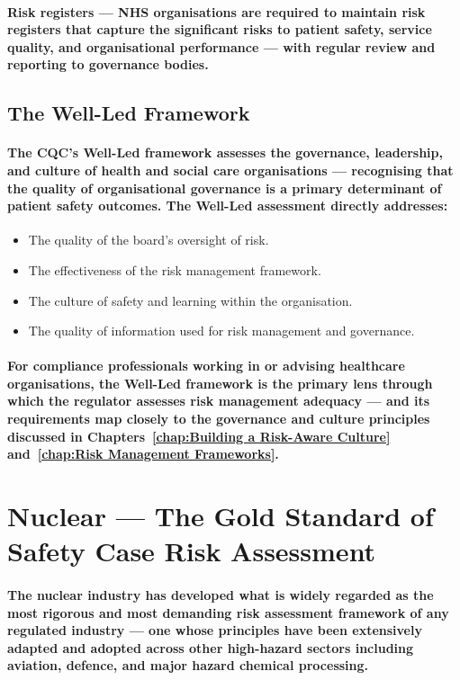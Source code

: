 \paragraph{\textbf{Risk registers} — NHS organisations are required to maintain risk registers that capture the significant risks to patient safety, service quality, and organisational performance — with regular review and reporting to governance bodies.}

\subsection{The Well-Led Framework}
\paragraph{The CQC's \textbf{Well-Led} framework assesses the governance, leadership, and culture of health and social care organisations — recognising that the quality of organisational governance is a primary determinant of patient safety outcomes. The Well-Led assessment directly addresses:}
\begin{itemize}
  \item{The quality of the board's oversight of risk.}
  \item{The effectiveness of the risk management framework.}
  \item{The culture of safety and learning within the organisation.}
  \item{The quality of information used for risk management and governance.}
\end{itemize}
\paragraph{For compliance professionals working in or advising healthcare organisations, the Well-Led framework is the primary lens through which the regulator assesses risk management adequacy — and its requirements map closely to the governance and culture principles discussed in Chapters~\ref{chap:Building a Risk-Aware Culture} and~\ref{chap:Risk Management Frameworks}.}

\section{Nuclear — The Gold Standard of Safety Case Risk Assessment}
\paragraph{The nuclear industry has developed what is widely regarded as the most rigorous and most demanding risk assessment framework of any regulated industry — one whose principles have been extensively adapted and adopted across other high-hazard sectors including aviation, defence, and major hazard chemical processing.}

